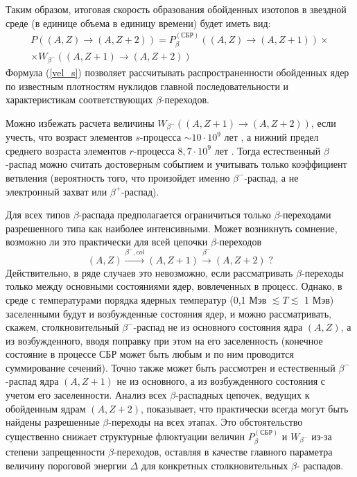 Таким образом, итоговая скорость образования обойденных изотопов в звездной
среде (в единице объема в единицу времени) будет иметь вид:
\begin{multline}\label{vel_s}
P((A,Z){\to}(A,Z+2))=P_\beta^{(СБР)}((A,Z){\to}(A,Z+1))\times\\
\times W_{\beta^-}((A,Z+1){\to}(A,Z+2))
\end{multline}
Формула (\ref{vel_s}) позволяет рассчитывать
распространенности обойденных ядер
по известным плотностям нуклидов главной последовательности и характеристикам
соответствующих $\beta$-переходов.

Можно избежать расчета величины $W_{\beta^-}((A,Z+1){\to}(A,Z+2))$, если учесть, что возраст элементов $s$-процесса $\sim
10\cdot 10^9$ лет \cite{chechev}, а нижний предел среднего возраста элементов $r$-процесса $8,7\cdot 10^9$ лет
\cite{schramm73}. Тогда естественный $\beta$-распад можно считать достоверным событием и учитывать только коэффициент
ветвления (вероятность того, что произойдет именно $\beta^-$-распад, а не электронный захват или $\beta^+$-распад).

         Для всех типов $\beta$-распада предполагается
         ограничиться  только $\beta$-переходами разрешенного
         типа как наиболее интенсивными. Может возникнуть
         сомнение, возможно ли это практически для всей цепочки
         $\beta$-переходов $$(A,Z)\stackrel{\beta^-,col}
         {\longrightarrow}(A,Z+1)\stackrel{\beta^-}
         {\longrightarrow}(A,Z+2)\;?$$ Действительно, в ряде случаев
         это невозможно, если рассматривать $\beta$-переходы
         только между основными состояниями ядер, вовлеченных в
         процесс. Однако, в среде с температурами порядка ядерных
         температур (0,1 Мэв $\lesssim T \lesssim $ 1 Мэв)
         заселенными будут и возбужденные состояния ядер, и можно
         рассматривать, скажем, столкновительный $\beta^-$-распад
         не из основного состояния ядра $(A,Z)$, а из возбужденного,
         вводя поправку
         при этом на его заселенность (конечное состояние в
         процессе СБР может быть любым и по ним проводится
         суммирование сечений). Точно также может быть рассмотрен
         и естественный $\beta^-$-распад ядра $(A,Z+1)$ не из
         основного, а из
         возбужденного состояния с учетом его заселенности.
         Анализ всех $\beta$-распадных цепочек, ведущих к
         обойденным ядрам $(A,Z+2)$, показывает, что практически
         всегда могут быть найдены разрешенные $\beta$-переходы
         на всех этапах. Это  обстоятельство существенно снижает
         структурные флюктуации величин $P_\beta^{(СБР)}$ и $W_{\beta^-}$
         из-за
         степени запрещенности $\beta$-переходов, оставляя в
         качестве главного параметра величину пороговой энергии
         $\Delta$ для конкретных столкновительных $\beta$-
         распадов.

